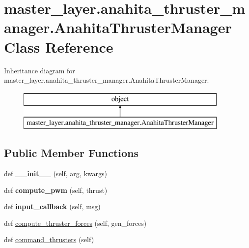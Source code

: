 \hypertarget{classmaster__layer_1_1anahita__thruster__manager_1_1AnahitaThrusterManager}{}\section{master\+\_\+layer.\+anahita\+\_\+thruster\+\_\+manager.\+Anahita\+Thruster\+Manager Class Reference}
\label{classmaster__layer_1_1anahita__thruster__manager_1_1AnahitaThrusterManager}
Inheritance diagram for master\+\_\+layer.\+anahita\+\_\+thruster\+\_\+manager.\+Anahita\+Thruster\+Manager\+:\begin{figure}[H]
\begin{center}
\leavevmode
\includegraphics[height=2.000000cm]{classmaster__layer_1_1anahita__thruster__manager_1_1AnahitaThrusterManager}
\end{center}
\end{figure}
\subsection*{Public Member Functions}
\begin{DoxyCompactItemize}
\item 
\mbox{\label{classmaster__layer_1_1anahita__thruster__manager_1_1AnahitaThrusterManager_a51137f1973d4db38374e401a500bc8e8}} 
def {\bfseries \+\_\+\+\_\+init\+\_\+\+\_\+} (self, arg, kwargs)
\item 
\mbox{\label{classmaster__layer_1_1anahita__thruster__manager_1_1AnahitaThrusterManager_a00ee062fb635fe83f7aa5177869bd8ce}} 
def {\bfseries compute\+\_\+pwm} (self, thrust)
\item 
\mbox{\label{classmaster__layer_1_1anahita__thruster__manager_1_1AnahitaThrusterManager_a7a10f8f3dd09bb0cce566758a856f2d5}} 
def {\bfseries input\+\_\+callback} (self, msg)
\item 
def \hyperlink{classmaster__layer_1_1anahita__thruster__manager_1_1AnahitaThrusterManager_ad4dd17de08cd3f4f455d98aa584caf24}{compute\+\_\+thruster\+\_\+forces} (self, gen\+\_\+forces)
\item 
def \hyperlink{classmaster__layer_1_1anahita__thruster__manager_1_1AnahitaThrusterManager_adbd3b3d5485e9c627943896f2b2403c1}{command\+\_\+thrusters} (self)
\end{DoxyCompactItemize}
